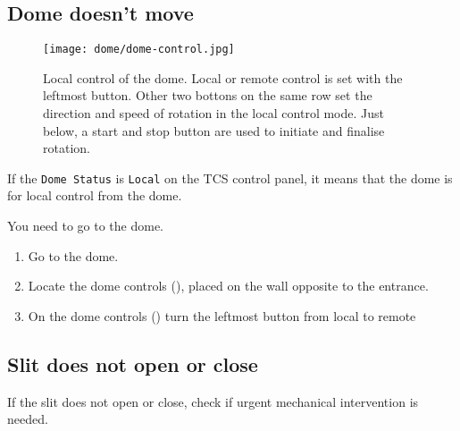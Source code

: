 \documentclass[11pt,fleqn,a4paper]{book}
\begin{document}
\subsection{Dome doesn't move}
\begin{figure}
\centering
\texttt{[image: dome/dome-control.jpg]}
\caption[Local control of the dome]{Local control of the \gls{dome}.  Local or remote control is set with the leftmost button.  Other two bottons on the same row set the direction and speed of rotation in the local control mode.  Just below, a start and stop button are used to initiate and finalise rotation.}
\label{fig:dome-control}
\end{figure}

If the \texttt{Dome Status} is \texttt{Local} on the \gls{TCS control panel}, it means that the dome is for local control from the dome.

You need to go to the \gls{dome}.

\begin{enumerate}
   \item Go to the dome.
   \item Locate the dome controls (), placed on the wall opposite to the entrance.
   \item On the dome controls () turn the leftmost button from local to remote
\end{enumerate}

\subsection{Slit does not open or close}
If the slit does not open or close, check if urgent mechanical intervention is needed.
\end{document}
